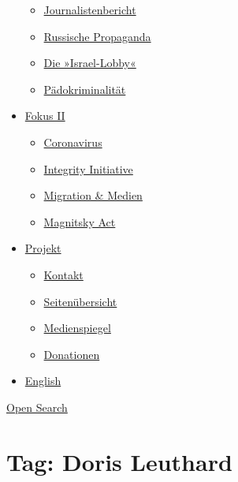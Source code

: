 \begin{itemize}
  \begin{itemize}
  \tightlist
  \item
    \href{https://swprs.org/bericht-eines-journalisten/}{Journalistenbericht}
  \item
    \href{https://swprs.org/russische-propaganda/}{Russische Propaganda}
  \item
    \href{https://swprs.org/die-israel-lobby-fakten-und-mythen/}{Die
    »Israel-Lobby«}
  \item
    \href{https://swprs.org/geopolitik-und-paedokriminalitaet/}{Pädokriminalität}
  \end{itemize}
\item
  \href{https://swprs.org/migration-und-medien/}{Fokus II}

  \begin{itemize}
  \tightlist
  \item
    \href{https://swprs.org/covid-19-hinweis-ii/}{Coronavirus}
  \item
    \href{https://swprs.org/die-integrity-initiative/}{Integrity
    Initiative}
  \item
    \href{https://swprs.org/migration-und-medien/}{Migration \& Medien}
  \item
    \href{https://swprs.org/der-fall-magnitsky/}{Magnitsky Act}
  \end{itemize}
\item
  \href{https://swprs.org/kontakt/}{Projekt}

  \begin{itemize}
  \tightlist
  \item
    \href{https://swprs.org/kontakt/}{Kontakt}
  \item
    \href{https://swprs.org/uebersicht/}{Seitenübersicht}
  \item
    \href{https://swprs.org/medienspiegel/}{Medienspiegel}
  \item
    \href{https://swprs.org/donationen/}{Donationen}
  \end{itemize}
\item
  \href{https://swprs.org/contact/}{English}
\end{itemize}

\protect\hyperlink{}{Open Search}

\hypertarget{tag-doris-leuthard}{%
\section{Tag: Doris Leuthard}\label{tag-doris-leuthard}}

